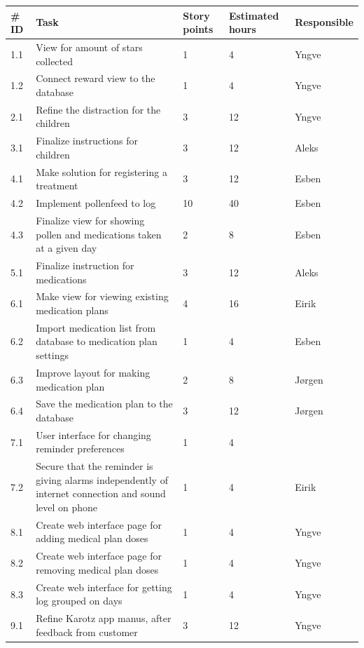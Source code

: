 \begin{table}
	\begin{center}
		\begin{tabular}{|p{2.0cm}| p{7.0cm}| p{2.0cm}|p{2.0cm}|p{2.0cm}|}
			\hline
			\#  ID 	& Task 	& Story points 	& Estimated hours & Responsible \\
			\hline
			1.1 & View for amount of stars collected & 1 & 4 & Yngve\\
			\hline
			1.2 & Connect reward view to the database & 1 & 4 & Yngve\\
			\hline
			2.1 & Refine the distraction for the children & 3 & 12 & Yngve\\
			\hline
			3.1 & Finalize instructions for children & 3 & 12 & Aleks\\
			\hline
			4.1 & Make solution for registering a treatment & 3 & 12 & Esben\\
			\hline
			4.2 & Implement pollenfeed to log & 10 & 40 & Esben\\
			\hline
			4.3 & Finalize view for showing pollen and medications taken at a given day & 2 & 8 & Esben\\
			\hline
			5.1 & Finalize instruction for medications & 3 & 12 & Aleks\\
			\hline
			6.1 & Make view for viewing existing medication plans & 4 & 16 & Eirik\\
			\hline
			6.2 & Import medication list from database to medication plan settings & 1 & 4 & Esben\\
			\hline
			6.3 & Improve layout for making medication plan & 2 & 8 & J\o rgen\\
			\hline
			6.4 & Save the medication plan to the database & 3 & 12 & J\o rgen\\
			\hline
			7.1 & User interface for changing reminder preferences & 1 & 4 & \\
			\hline
			7.2 & Secure that the reminder is giving alarms independently of internet connection and sound level on phone & 1 & 4 & Eirik \\
			\hline
			8.1 & Create web interface page for adding medical plan doses & 1 & 4 & Yngve \\
			\hline
			8.2 & Create web interface page for removing medical plan doses & 1 & 4 & Yngve \\
			\hline
			8.3 & Create web interface for getting log grouped on days & 1 & 4 & Yngve \\
			\hline
			9.1 & Refine Karotz app manus, after feedback from customer & 3 & 12 & Yngve \\

\end{tabular}
\end{center}
\end{table}
